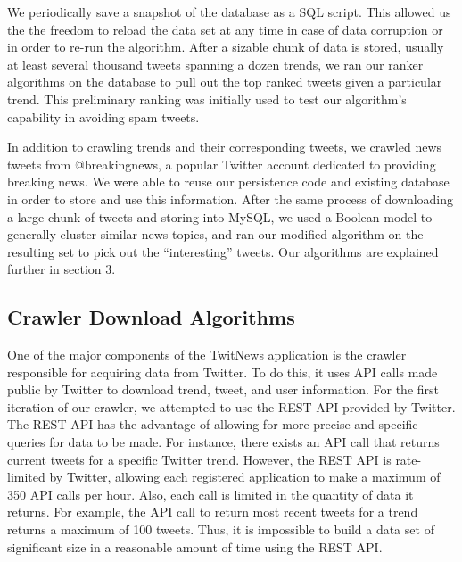 \documentclass[10pt]{proc}
\begin{document}
  We periodically save a snapshot of the database as a SQL script. This allowed us the the freedom to reload the data set at any time in case of data corruption or in order to re-run the algorithm. After a sizable chunk of data is stored, usually at least several thousand tweets spanning a dozen trends, we ran our ranker algorithms on the database to pull out the top ranked tweets given a particular trend.  This preliminary ranking was initially used to test our algorithm's capability in avoiding spam tweets.

  In addition to crawling trends and their corresponding tweets, we crawled news tweets from @breakingnews, a popular Twitter account dedicated to providing breaking news.  We were able to reuse our persistence code and existing database in order to store and use this information. After the same process of downloading a large chunk of tweets and storing into MySQL, we used a Boolean model to generally cluster similar news topics, and ran our modified algorithm on the resulting set to pick out the ``interesting'' tweets.  Our algorithms are explained further in section 3.

  \subsection{Crawler Download Algorithms}
  One of the major components of the TwitNews application is the crawler responsible for acquiring data from Twitter. To do this, it uses API calls made public by Twitter to download trend, tweet, and user information. For the first iteration of our crawler, we attempted to use the REST API provided by Twitter. The REST API\cite{Twitter_api} has the advantage of allowing for more precise and specific queries for data to be made. For instance, there exists an API call that returns current tweets for a specific Twitter trend. However, the REST API is rate-limited by Twitter, allowing each registered application to make a maximum of 350 API calls per hour. Also, each call is limited in the quantity of data it returns. For example, the API call to return most recent tweets for a trend returns a maximum of 100 tweets. Thus, it is impossible to build a data set of significant size in a reasonable amount of time using the REST API.
\end{document}
